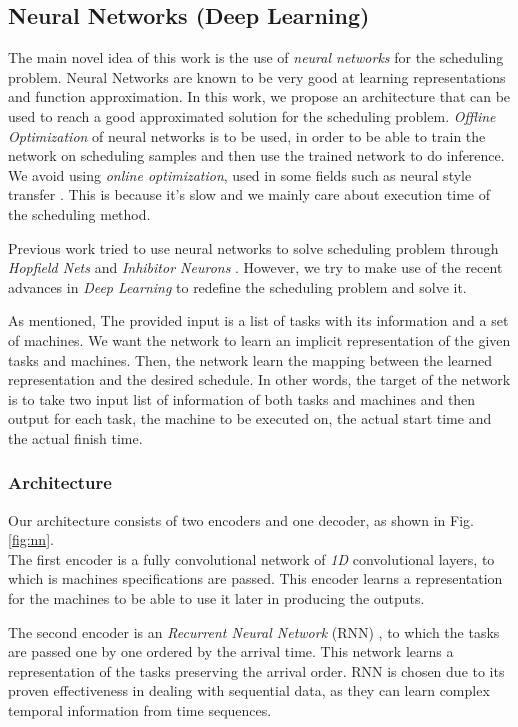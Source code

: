 \subsection{Neural Networks (Deep Learning)}
The main novel idea of this work is the use of \emph{neural networks} for the scheduling problem. Neural Networks are known to be very good at learning representations and function approximation. In this work, we propose an architecture that can be used to reach a good approximated solution for the scheduling problem. \emph{Offline Optimization} of neural networks is to be used, in order to be able to train the network on scheduling samples and then use the trained network to do inference. We avoid using \emph{online optimization}, used in some fields such as neural style transfer \cite{gatys2015neural}. This is because it's slow and we mainly care about execution time of the scheduling method.

Previous work tried to use neural networks to solve scheduling problem through \emph{Hopfield Nets} \cite{sathasivam2008logic} and \emph{Inhibitor Neurons} \cite{article3}. However, we try to make use of the recent advances in \emph{Deep Learning} to redefine the scheduling problem and solve it. 

As mentioned, The provided input is a list of tasks with its information and a set of machines. We want the network to learn an implicit representation of the given tasks and machines. Then, the network learn the mapping between the learned representation and the desired schedule. In other words, the target of the network is to take two input list of information of both tasks and machines and then output for each task, the machine to be executed on, the actual start time and the actual finish time. \\
    
\subsubsection{Architecture}
Our architecture consists of two encoders and one decoder, as shown in Fig.\ref{fig:nn}. \\
The first encoder is a fully convolutional network of \emph{1D} convolutional layers, to which is machines specifications are passed. This encoder learns a representation for the machines to be able to use it later in producing the outputs.

The second encoder is an \emph{Recurrent Neural Network} (RNN) \cite{chung2014empirical}, to which the tasks are passed one by one ordered by the arrival time. This network learns a representation of the tasks preserving the arrival order. RNN is chosen due to its proven effectiveness in dealing with sequential data, as they can learn complex temporal information from time sequences.

